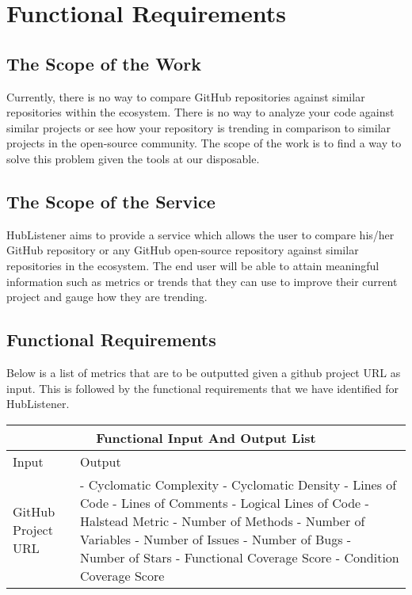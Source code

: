 \documentclass{article}
\begin{document}
\newpage
\section{Functional Requirements}

\subsection{The Scope of the Work}

Currently, there is no way to compare GitHub repositories against similar repositories within the ecosystem. There is no way to analyze your code against similar projects or see how your repository is trending in comparison to similar projects in the open-source community. The scope of the work is to find a way to solve this problem given the tools at our disposable.


\subsection{The Scope of the Service}
HubListener aims to provide a service which allows the user to compare his/her GitHub repository or any GitHub open-source repository against similar repositories in the ecosystem. The end user will be able to attain meaningful information such as metrics or trends that they can use to improve their current project and gauge how they are trending. 

\subsection{Functional Requirements }

Below is a list of metrics that are to be outputted given a github project URL as input. This is followed by the functional requirements that we have identified for HubListener. \newline

\begin{tabular}{ |p{6cm}||p{6cm}| }
\hline
\multicolumn{2}{|c|}{Functional Input And Output List} \\
\hline
Input & Output \\
\hline 
GitHub Project URL & 
- Cyclomatic Complexity \newline
- Cyclomatic Density\newline
- Lines of Code \newline
- Lines of Comments\newline
- Logical Lines of Code\newline
- Halstead Metric \newline
- Number of Methods\newline
- Number of Variables\newline 
- Number of Issues\newline
- Number of Bugs\newline
- Number of Stars\newline
- Functional Coverage Score\newline
- Condition Coverage Score \\
\hline
\end{tabular}
\end{document}
